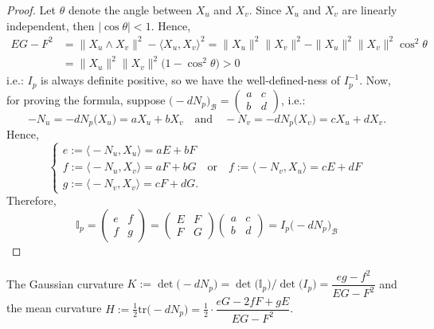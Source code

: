 \begin{proof}
Let $\theta$ denote the angle between $X_u$ and $X_v$. Since $X_u$ and $X_v$ are linearly independent, then $|\cos\theta| < 1$. Hence,
\begin{align*}
    EG - F^2 &= \big\|X_u\wedge X_v\big\|^2 - \big\langle X_u, X_v\big\rangle^2 = \|X_u\|^2\|X_v\|^2 - \|X_u\|^2\|X_v\|^2\cos^2\theta\\
    &= \|X_u\|^2\|X_v\|^2\big(1 - \cos^2\theta\big) > 0
\end{align*}
i.e.: $I_p$ is always definite positive, so we have the well-defined-ness of $I_p^{-1}$. Now, for proving the formula, suppose $\big(-dN_p\big)_\mathcal{B} = \begin{pmatrix}a & c\\ b & d\end{pmatrix}$, i.e.:
\[
-N_u = -dN_p\big(X_u\big) = aX_u + bX_v \quad\text{and}\quad -N_v = -dN_p\big(X_v\big) = cX_u + dX_v.
\]
Hence,
\[
\begin{cases}
e := \big\langle -N_u, X_u\big\rangle = aE + bF\\[1mm]
f := \big\langle -N_u, X_v\big\rangle = aF + bG \quad\text{or}\quad f := \big\langle -N_v, X_u\big\rangle = cE + dF\\[1mm]
g := \big\langle -N_v, X_v\big\rangle = cF + dG.
\end{cases}
\]
Therefore,
\[
\mathbb{I}_p = \begin{pmatrix}e & f\\ f & g\end{pmatrix} = \begin{pmatrix}E & F\\ F & G\end{pmatrix}\begin{pmatrix}a & c\\ b & d\end{pmatrix} = I_p\big(-dN_p\big)_\mathcal{B}
\]
\end{proof}

\begin{corollary}
The Gaussian curvature $K := \det\big(-dN_p\big) = \det\big(\mathbb{I}_p\big)\big/\det\big(I_p\big) = \dfrac{eg - f^2}{EG - F^2}$ and the mean curvature $H := \frac{1}{2}\mathrm{tr}\big(-dN_p\big) = \frac{1}{2}\cdot\dfrac{eG - 2fF + gE}{EG - F^2}$.
\end{corollary}

